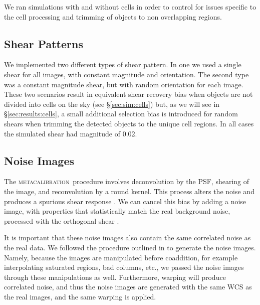 \documentclass[twocolumn,twocolappendix,astrosym]{openjournal}
\newcommand{\mcal}{\textsc{metacalibration}}
\newcommand{\mshear}{0.02}
\begin{document}
We ran simulations with and without cells in order to control for issues
specific to the cell processing and trimming of objects to non overlapping
regions.


\subsection{Shear Patterns} \label{sec:sim:shears}

We implemented two different types of shear pattern.  In one we used a single
shear for all images, with constant magnitude and orientation.  The second type
was a constant magnitude shear, but with random orientation for each image.
These two scenarios result in equivalent shear recovery bias when objects are
not divided into cells on the sky (see \S \ref{sec:sim:cells}) but, as we will
see in \S \ref{sec:results:cells}, a small additional selection bias is
introduced for random shears when trimming the detected objects to the unique
cell regions.  In all cases the simulated shear had magnitude of \mshear.

\subsection{Noise Images} \label{sec:sim:noiseimages}

The \mcal\ procedure involves deconvolution by the PSF, shearing of the image,
and reconvolution by a round kernel.  This process alters the noise and
produces a spurious shear response \citep{SheldonMcal2017}.  We can cancel this
bias by adding a noise image, with properties that statistically match the real
background noise, processed with the orthogonal shear
\citep{SheldonMcal2017,mdet20}.

It is important that these noise images also contain the same correlated noise
as the real data. We followed the procedure outlined in \citet{BeckerMdetCoadd}
to generate the noise images. Namely, because the images are manipulated before
coaddition, for example interpolating saturated regions, bad columns, etc., we
passed the noise images through these manipulations as well. Furthermore,
warping will produce correlated noise, and thus the noise images are generated
with the same WCS as the real images, and the same warping is applied.
\end{document}
